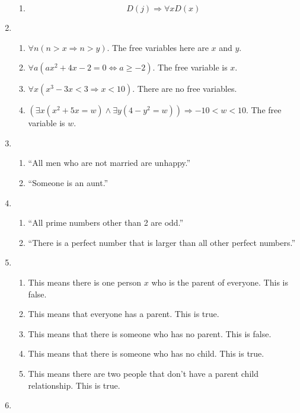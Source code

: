\documentclass{article}
\begin{document}
\begin{enumerate}
\begin{enumerate}
  \item
    \begin{equation*}
      D(j) \Rightarrow \forall x D(x)
    \end{equation*}
	\end{enumerate}
\item
  \begin{enumerate}
  \item
    $\forall n (n > x \Rightarrow n > y)$.  The free variables here are $x$ and $y$.
  \item
    $\forall a (ax^2 + 4x - 2 = 0 \iff a \geq -2)$.  The free variable is $x$.
  \item
    $\forall x (x^3 - 3x < 3 \Rightarrow x < 10)$.  There are no free variables.
  \item
    $(\exists x (x^2 + 5x = w) \land \exists y (4 - y^2 = w)) \Rightarrow -10 < w < 10$.  The free variable is $w$.
  \end{enumerate}
\item
  \begin{enumerate}
    \item ``All men who are not married are unhappy.''
    \item ``Someone is an aunt.''
  \end{enumerate}
\item
  \begin{enumerate}
  \item ``All prime numbers other than 2 are odd.''
  \item ``There is a perfect number that is larger than all other perfect numbers.''
  \end{enumerate}
\item
  \begin{enumerate}
  \item This means there is one person $x$ who is the parent of everyone.  This is false.
  \item This means that everyone has a parent.  This is true.
  \item This means that there is someone who has no parent.  This is false.
  \item This means that there is someone who has no child.  This is true.
  \item This means there are two people that don't have a parent child relationship.  This is true.
  \end{enumerate}
\item
  \begin{enumerate}

\end{enumerate}
\end{enumerate}
\end{document}
